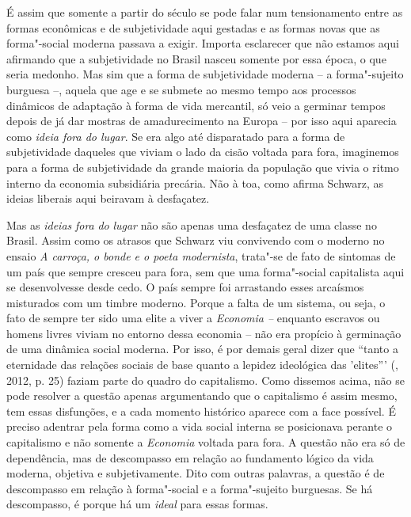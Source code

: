 É assim que somente a partir do século  se pode falar num
tensionamento entre as formas econômicas e de subjetividade aqui
gestadas e as formas novas que as forma"-social moderna passava a exigir.
Importa esclarecer que não estamos aqui afirmando que a subjetividade no
Brasil nasceu somente por essa época, o que seria medonho. Mas sim que a
forma de subjetividade moderna -- a forma"-sujeito burguesa --, aquela
que age e se submete ao mesmo tempo aos processos dinâmicos de adaptação
à forma de vida mercantil, só veio a germinar tempos depois de já dar
mostras de amadurecimento na Europa -- por isso aqui aparecia como
\emph{ideia fora do lugar}. Se era algo até disparatado para a forma de
subjetividade daqueles que viviam o lado da cisão voltada para fora,
imaginemos para a forma de subjetividade da grande maioria da população
que vivia o ritmo interno da economia subsidiária precária. Não à toa,
como afirma Schwarz, as ideias liberais aqui beiravam à desfaçatez.

Mas as \emph{ideias} \emph{fora} \emph{do} \emph{lugar} não são apenas
uma desfaçatez de uma classe no Brasil. Assim como os atrasos que
Schwarz viu convivendo com o moderno no ensaio \emph{A carroça, o bonde
e o poeta modernista}, trata"-se de fato de sintomas de um país que
sempre cresceu para fora, sem que uma forma"-social capitalista aqui se
desenvolvesse desde cedo. O país sempre foi arrastando esses arcaísmos
misturados com um timbre moderno. Porque a falta de um sistema, ou seja,
o fato de sempre ter sido uma elite a viver a \emph{Economia --}
enquanto escravos ou homens livres viviam no entorno dessa economia --
não era propício à germinação de uma dinâmica social moderna. Por isso,
é por demais geral dizer que ``tanto a eternidade das relações sociais
de base quanto a lepidez ideológica das 'elites''' (, 2012, p.
25) faziam parte do quadro do capitalismo. Como dissemos acima, não se
pode resolver a questão apenas argumentando que o capitalismo é assim
mesmo, tem essas disfunções, e a cada momento histórico aparece com a
face possível. É preciso adentrar pela forma como a vida social interna
se posicionava perante o capitalismo e não somente a \emph{Economia}
voltada para fora. A questão não era só de dependência, mas de
descompasso em relação ao fundamento lógico da vida moderna, objetiva e
subjetivamente. Dito com outras palavras, a questão é de descompasso em
relação à forma"-social e a forma"-sujeito burguesas. Se há descompasso, é
porque há um \emph{ideal} para essas formas.

